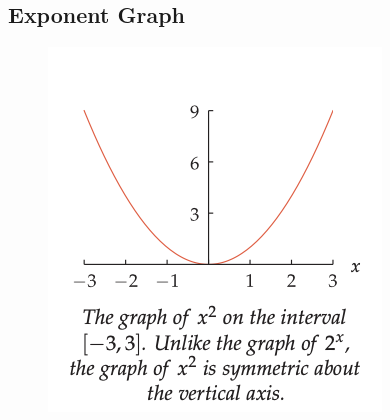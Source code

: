\subsection{Exponent Graph}
\begin{figure}
\centering
\includegraphics[scale=0.3]{pics/exp-vs-poly1.png}

\end{figure}
